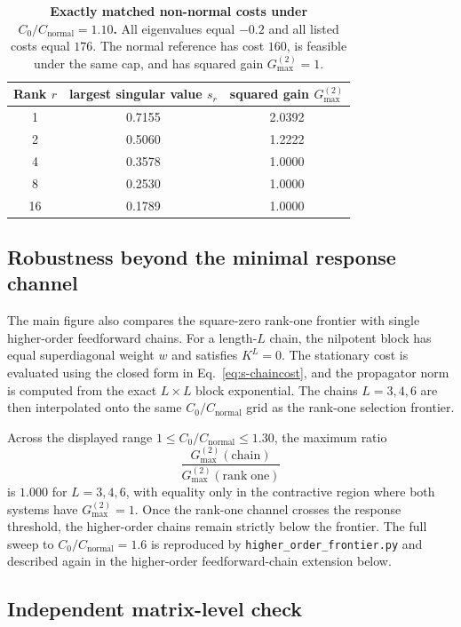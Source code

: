 \documentclass[
  aps,prl,preprint,notitlepage,superscriptaddress,nofootinbib,longbibliography,
  amsmath,amssymb
]{revtex4-2}
\newcommand{\Gmax}{G_{\max}^{(2)}}
\begin{document}
\begin{table}[t]
\caption{\textbf{Exactly matched non-normal costs under
$C_0/C_{\mathrm{normal}}=1.10$.}
All eigenvalues equal $-0.2$ and all listed costs equal $176$. The normal
reference has cost $160$, is feasible under the same cap, and has squared gain
$\Gmax=1$.}
\label{tab:s-matched}
\begin{ruledtabular}
\begin{tabular}{ccc}
Rank $r$ & largest singular value $s_r$ & squared gain $\Gmax$\\
\midrule
1  & 0.7155 & 2.0392\\
2  & 0.5060 & 1.2222\\
4  & 0.3578 & 1.0000\\
8  & 0.2530 & 1.0000\\
16 & 0.1789 & 1.0000\\
\end{tabular}
\end{ruledtabular}
\end{table}

\subsection{Robustness beyond the minimal response channel}

The main figure also compares the square-zero rank-one frontier with single
higher-order feedforward chains.  For a length-$L$ chain, the nilpotent block
has equal superdiagonal weight $w$ and satisfies $K^L=0$. The stationary cost
is evaluated using the closed form in Eq.~\eqref{eq:s-chaincost}, and the
propagator norm is computed from the exact $L\times L$ block exponential.  The
chains $L=3,4,6$ are then interpolated onto the same
$C_0/C_{\mathrm{normal}}$ grid as the rank-one selection frontier.

Across the displayed range $1\le C_0/C_{\mathrm{normal}}\le1.30$, the maximum
ratio
\begin{equation}
\frac{\Gmax(\mathrm{chain})}{\Gmax(\mathrm{rank\;one})}
\end{equation}
is $1.000$ for $L=3,4,6$, with equality only in the contractive region where
both systems have $\Gmax=1$. Once the rank-one channel crosses the response
threshold, the higher-order chains remain strictly below the frontier.  The
full sweep to $C_0/C_{\mathrm{normal}}=1.6$ is reproduced by
\texttt{higher\_order\_frontier.py} and described again in the
higher-order feedforward-chain extension below.

\subsection{Independent matrix-level check}
\end{document}
